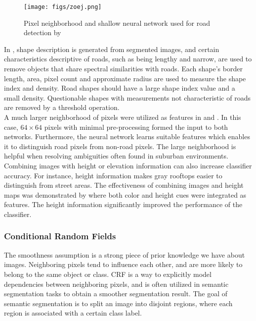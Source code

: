 \begin{figure}
\begin{center}
\texttt{[image: figs/zoej.png]}
\caption[Shallow neural network]{Pixel neighborhood and shallow neural network used for road detection by \cite{Mokhtarzade_road_ann} }
\label{fig:zoej_neural_network}
\end{center}
\end{figure}

In \cite{Song_road_extraction_svm}, shape description is generated from segmented images, and certain characteristics descriptive of roads, such as being lengthy and narrow, are used to remove objects that share spectral similarities with roads. Each shape's border length, area, pixel count and approximate radius are used to measure the shape index and density. Road shapes should have a large shape index value and a small density. Questionable shapes with measurements not characteristic of roads are removed by a threshold operation.\\

A much larger neighborhood of pixels were  utilized as features in \citep{Mnih_aerial_images_noisy} and \citep{Mnih_roads_high_res_aerial_images}. In this case, $64 \times 64$ pixels with minimal pre-processing formed the input to both  networks. Furthermore, the neural network learns suitable features which enables  it to distinguish road pixels from non-road pixels. The large neighborhood is helpful when resolving ambiguities often found in suburban environments. \\

  Combining images with height or elevation information can also increase classifier accuracy. For instance, height information makes gray rooftops easier to distinguish from street areas. The effectiveness of combining images and height maps was demonstrated by \cite{Kluckner_semantic_height} where both color and height cues were integrated as features. The height information significantly improved the performance of the classifier.
  

\subsubsection{Conditional Random Fields}
The smoothness assumption is a strong piece of prior knowledge we have about images. Neighboring pixels tend to influence each other, and are more likely to belong to the same object or class. \ac{CRF} is a way to explicitly model dependencies between neighboring pixels, and is often utilized in semantic segmentation tasks to obtain a smoother segmentation result. The goal of semantic segmentation is to split an image into disjoint regions, where each region is associated with a certain class label.\\

